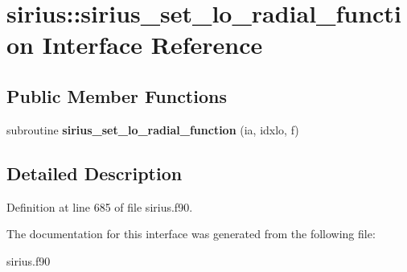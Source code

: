 \hypertarget{interfacesirius_1_1sirius__set__lo__radial__function}{}\section{sirius\+:\+:sirius\+\_\+set\+\_\+lo\+\_\+radial\+\_\+function Interface Reference}
\label{interfacesirius_1_1sirius__set__lo__radial__function}
\subsection*{Public Member Functions}
\begin{DoxyCompactItemize}
\item 
\hypertarget{interfacesirius_1_1sirius__set__lo__radial__function_ad80ba9b6ca52e76d4b4df4da888760f6}{}subroutine {\bfseries sirius\+\_\+set\+\_\+lo\+\_\+radial\+\_\+function} (ia, idxlo, f)\label{interfacesirius_1_1sirius__set__lo__radial__function_ad80ba9b6ca52e76d4b4df4da888760f6}

\end{DoxyCompactItemize}


\subsection{Detailed Description}


Definition at line 685 of file sirius.\+f90.



The documentation for this interface was generated from the following file\+:\begin{DoxyCompactItemize}
\item 
sirius.\+f90\end{DoxyCompactItemize}
